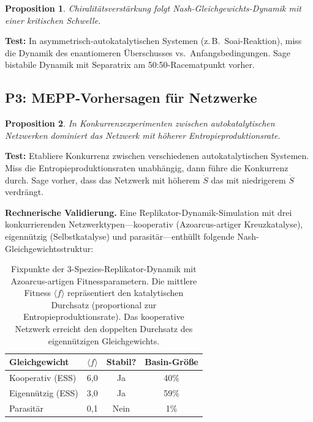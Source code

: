 \documentclass[12pt,a4paper]{article}
\newtheorem{proposition}{Proposition}
\theoremstyle{remark}
\begin{document}
\begin{proposition}
Chiralit\"atsverst\"arkung folgt Nash-Gleichgewichts-Dynamik mit einer kritischen Schwelle.
\end{proposition}

\textbf{Test:} In asymmetrisch-autokatalytischen Systemen (z.\,B.\ Soai-Reaktion), miss die Dynamik des enantiomeren \"Uberschusses vs.\ Anfangsbedingungen. Sage bistabile Dynamik mit Separatrix am 50:50-Racematpunkt vorher.

\subsection{P3: MEPP-Vorhersagen f\"ur Netzwerke}

\begin{proposition}
In Konkurrenzexperimenten zwischen autokatalytischen Netzwerken dominiert das Netzwerk mit h\"oherer Entropieproduktionsrate.
\end{proposition}

\textbf{Test:} Etabliere Konkurrenz zwischen verschiedenen autokatalytischen Systemen. Miss die Entropieproduktionsraten unabh\"angig, dann f\"uhre die Konkurrenz durch. Sage vorher, dass das Netzwerk mit h\"oherem $\dot{S}$ das mit niedrigerem $\dot{S}$ verdr\"angt.

\textbf{Rechnerische Validierung.} Eine Replikator-Dynamik-Simulation mit drei konkurrierenden Netzwerktypen---kooperativ (Azoarcus-artiger Kreuzkataly\-se), eigenn\"utzig (Selbstkatalyse) und parasit\"ar---enth\"ullt folgende Nash-Gleichgewichtsstruktur:

\begin{table}[ht]
\centering
\caption{Fixpunkte der 3-Spezies-Replikator-Dynamik mit Azoarcus-artigen Fitnessparametern. Die mittlere Fitness $\langle f \rangle$ repr\"asentiert den katalytischen Durchsatz (proportional zur Entropieproduktionsrate). Das kooperative Netzwerk erreicht den doppelten Durchsatz des eigenn\"utzigen Gleichgewichts.}
\label{tab:replicator-fps}
\begin{tabular}{lccc}
\toprule
\textbf{Gleichgewicht} & $\langle f \rangle$ & \textbf{Stabil?} & \textbf{Basin-Gr\"o\ss{}e} \\
\midrule
Kooperativ (ESS) & 6{,}0 & Ja & 40\% \\
Eigenn\"utzig (ESS) & 3{,}0 & Ja & 59\% \\
Parasit\"ar & 0{,}1 & Nein & 1\% \\
\bottomrule
\end{tabular}
\end{table}
\end{document}
